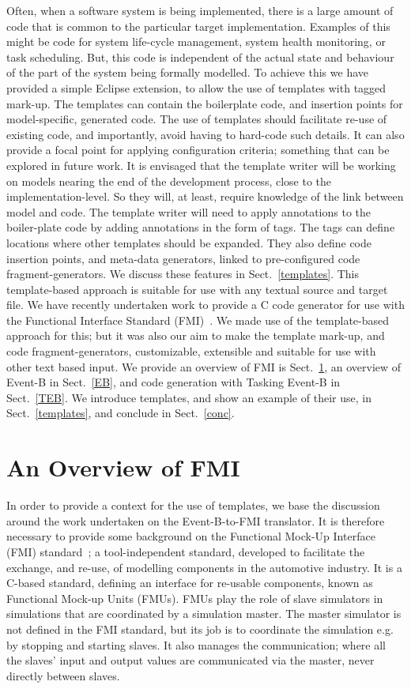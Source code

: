 \documentclass{llncs}%
\begin{document}
Often, when a software system is being implemented, there is a large amount of code that is common to the particular target implementation. Examples of this might be code for system life-cycle management, system health monitoring, or task scheduling. But, this code is independent of the actual state and behaviour of the part of the system being formally modelled. To achieve this we have provided a simple Eclipse extension, to allow the use of templates with tagged mark-up. The templates can contain the boilerplate code, and insertion points for model-specific, generated code. The use of templates should facilitate re-use of existing code, and importantly, avoid having to hard-code such details. It can also provide a focal point for applying configuration criteria; something that can be explored in future work. It is envisaged that the template writer will be working on models nearing the end of the development process, close to the implementation-level. So they will, at least, require knowledge of the link between model and code. The template writer will need to apply annotations to the boiler-plate code by adding annotations in the form of tags. The tags can define locations where other templates should be expanded. They also define code insertion points, and meta-data generators, linked to pre-configured code fragment-generators. We discuss these features in Sect.~\ref{templates}. This template-based approach is suitable for use with any textual source and target file. We have recently undertaken work to provide a C code generator for use with the Functional Interface Standard (FMI)~\cite{bloch2012,bloch2011,FMISTD}. We made use of the template-based approach for this; but it was also our aim to make the template mark-up, and code fragment-generators, customizable, extensible and suitable for use with other text based input. We provide an overview of FMI is Sect.~\ref{FMI}, an overview of Event-B in Sect.~\ref{EB}, and code generation with Tasking Event-B in Sect.~\ref{TEB}. We introduce templates, and show an example of their use, in Sect.~\ref{templates}, and conclude in Sect.~\ref{conc}.
%
%
\section{An Overview of FMI}\label{FMI}
%
In order to provide a context for the use of templates, we base the discussion around the work undertaken on the Event-B-to-FMI translator. It is therefore necessary to provide some background on the Functional Mock-Up Interface (FMI) standard~\cite{bloch2012,bloch2011,FMISTD}; a tool-independent standard, developed to facilitate the exchange, and re-use, of modelling components in the automotive industry. It is a C-based standard, defining an interface for re-usable components, known as Functional Mock-up Units (FMUs). FMUs play the role of slave simulators in simulations that are coordinated by a simulation master. The master simulator is not defined in the FMI standard, but its job is to coordinate the simulation e.g. by stopping and starting slaves. It also manages the communication; where all the slaves' input and output values are communicated via the master, never directly between slaves. 
\end{document}
